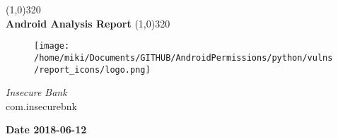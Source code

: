 \documentclass[12p]{article}
\begin{document}
\begin{titlepage}
\begin{center}
\line(1,0){320}\\
[0.25in]
\huge{\bfseries Android Analysis Report}
\line(1,0){320}\\
[0.5in]
\begin{figure}[H]
	\centering
	\texttt{[image: /home/miki/Documents/GITHUB/AndroidPermissions/python/vulns/report\_icons/logo.png]}
\end{figure}
\textsl{\LARGE Insecure Bank}\\
\textsf{\LARGE com.insecurebnk}\\
[2.5in]
\end{center}
\begin{flushright}
\textbf{\large Date 2018-06-12}
\end{flushright}
\end{titlepage}
\tableofcontents
\thispagestyle{empty}
\cleardoublepage
\setcounter{page}{1}
\end{document}
